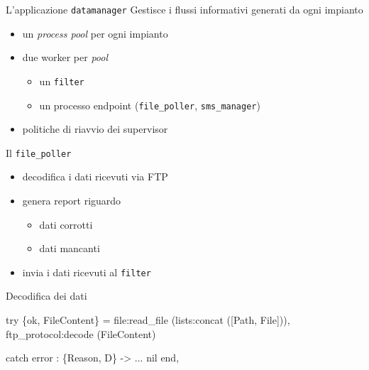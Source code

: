 \documentclass{beamer}
\newcommand{\red}[1]{\textcolor[rgb]{.8,0,0}{#1}}
\newcommand{\blue}[1]{\textcolor[rgb]{0,0,.7}{#1}}
\newcommand{\green}[1]{\textcolor[rgb]{0,.6,.1}{#1}}
\begin{document}
%
%

%
\begin{frame}{L'applicazione \texttt{datamanager}}
%
Gestisce i flussi informativi generati da ogni impianto
%
\begin{figure}[!h]
  \begin{center}
  \end{center}
\end{figure}
%
\begin{itemize}
\item un \emph{process pool} per ogni impianto
\item due \red{worker} per \emph{pool}
  \begin{itemize}
  \item un \texttt{filter}
  \item un processo \red{endpoint} (\texttt{file\_poller}, \texttt{sms\_manager})
  \end{itemize}
\item politiche di \red{riavvio} dei supervisor
\end{itemize}
%
\end{frame}
%

%
\begin{frame}[fragile]{Il \texttt{file\_poller}}
  \begin{itemize}
  \item decodifica i dati ricevuti via \red{FTP}
  \item genera \red{report} riguardo
    \begin{itemize}
    \item dati \red{corrotti}
    \item dati \red{mancanti}
    \end{itemize}
  \item invia i dati ricevuti al \texttt{filter}
  \end{itemize}
\begin{exampleblock}{Decodifica dei dati}
\begin{semiverbatim}
\begin{small}
\green{try}
 \{ok, \blue{FileContent}\} = 
   \red{file:read_file} (lists:concat ([Path, File])),
   \red{ftp_protocol:decode} (\blue{FileContent})
		
\green{catch} error : \{\blue{Reason}, D\} ->
    ...
  nil
\green{end},
\end{small}
\end{semiverbatim}
\end{exampleblock}  
\end{frame}
%
\end{document}
